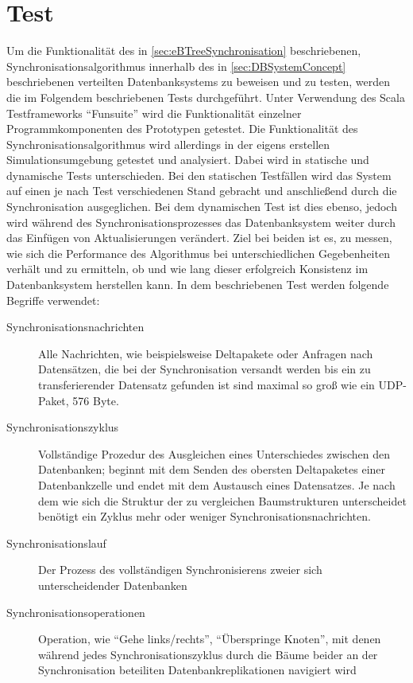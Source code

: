 \documentclass[a4paper,11pt,oneside,%
headsepline,												%
footsepline,												%
bibtotocnumbered									%
]{scrreprt}
\begin{document}
\chapter{Test}
Um die Funktionalität des in \autoref{sec:eBTreeSynchronisation} beschriebenen, Synchronisationsalgorithmus innerhalb des in \autoref{sec:DBSystemConcept}	beschriebenen verteilten Datenbanksystems zu beweisen und zu testen, werden die im Folgendem beschriebenen Tests durchgeführt. Unter Verwendung des Scala Testframeworks \enquote{Funsuite} wird die Funktionalität einzelner Programmkomponenten des Prototypen getestet. Die Funktionalität des Synchronisationsalgorithmus wird allerdings in der eigens erstellen Simulationsumgebung getestet und analysiert. Dabei wird in statische und dynamische Tests unterschieden. Bei den statischen Testfällen wird das System auf einen je nach Test verschiedenen Stand gebracht und anschließend durch die Synchronisation ausgeglichen. Bei dem dynamischen Test ist dies ebenso, jedoch wird während des Synchronisationsprozesses das Datenbanksystem weiter durch das Einfügen von Aktualisierungen verändert. Ziel bei beiden ist es, zu messen, wie sich die Performance des Algorithmus bei unterschiedlichen Gegebenheiten verhält und zu ermitteln, ob und wie lang dieser erfolgreich Konsistenz im Datenbanksystem herstellen kann. In dem beschriebenen Test werden folgende Begriffe verwendet:
\begin{description}
	\item[Synchronisationsnachrichten] Alle Nachrichten, wie beispielsweise Deltapakete oder Anfragen nach Datensätzen, die bei der Synchronisation versandt werden bis ein zu transferierender Datensatz gefunden ist sind maximal so groß wie ein UDP-Paket, 576 Byte.
	\item[Synchronisationszyklus] Vollständige Prozedur des Ausgleichen eines Unterschiedes zwischen den Datenbanken; beginnt mit dem Senden des obersten Deltapaketes einer Datenbankzelle und endet mit dem Austausch eines Datensatzes. Je nach dem wie sich die Struktur der zu vergleichen Baumstrukturen unterscheidet benötigt ein Zyklus mehr oder weniger Synchronisationsnachrichten.
	\item[Synchronisationslauf] Der Prozess des vollständigen Synchronisierens zweier sich unterscheidender Datenbanken
	\item[Synchronisationsoperationen] Operation, wie \enquote{Gehe links/rechts}, \enquote{Überspringe Knoten}, mit denen während jedes Synchronisationszyklus durch die Bäume beider an der Synchronisation beteiliten Datenbankreplikationen navigiert wird
\end{description}
\end{document}
